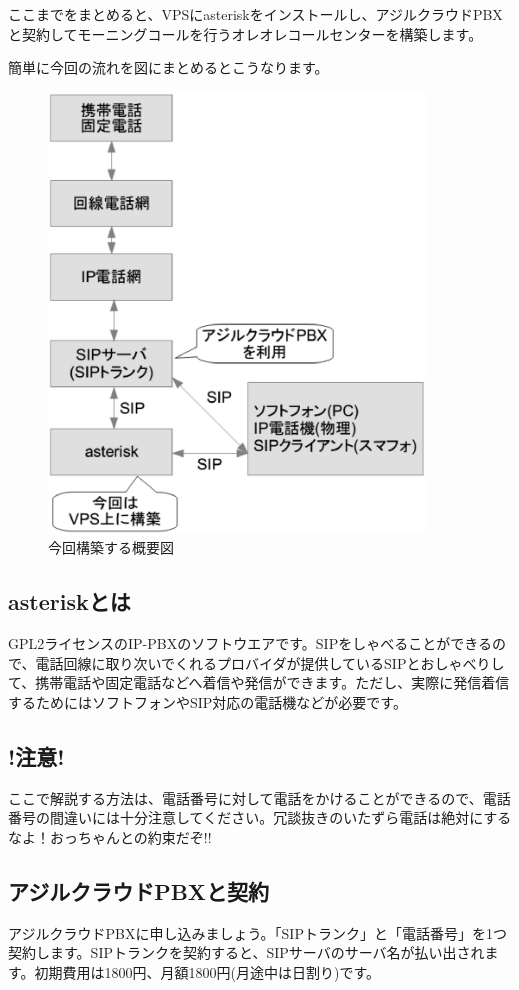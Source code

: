 ここまでをまとめると、VPSにasteriskをインストールし、アジルクラウドPBXと契約してモーニングコールを行うオレオレコールセンターを構築します。

簡単に今回の流れを図にまとめるとこうなります。

\begin{figure}[htbp]
 \begin{center}
  \includegraphics[width=100mm]{img/gaiyou.eps}
 \end{center}
 \caption{今回構築する概要図}
 \label{fig:gaiyou}
\end{figure}

\subsection{asteriskとは}
GPL2ライセンスのIP-PBXのソフトウエアです。SIPをしゃべることができるので、電話回線に取り次いでくれるプロバイダが提供しているSIPとおしゃべりして、携帯電話や固定電話などへ着信や発信ができます。ただし、実際に発信着信するためにはソフトフォンやSIP対応の電話機などが必要です。

\subsection{!注意!}
ここで解説する方法は、電話番号に対して電話をかけることができるので、電話番号の間違いには十分注意してください。冗談抜きのいたずら電話は絶対にするなよ！おっちゃんとの約束だぞ!!

\subsection{アジルクラウドPBXと契約}
アジルクラウドPBXに申し込みましょう。「SIPトランク」と「電話番号」を1つ契約します。SIPトランクを契約すると、SIPサーバのサーバ名が払い出されます。初期費用は1800円、月額1800円(月途中は日割り)です。

